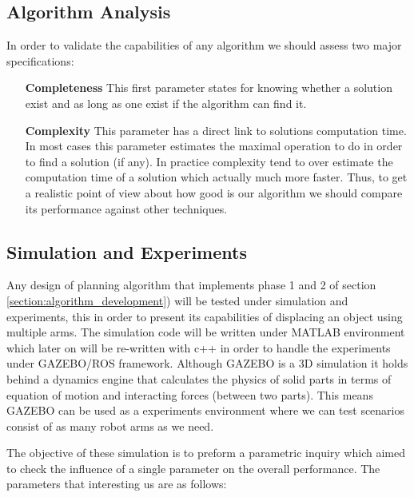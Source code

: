 \subsection{Algorithm Analysis}
In order to validate the capabilities of any algorithm we should assess two major specifications:

\begin{enumerate}

\item[\textbf{Completeness}] This first parameter states for knowing whether a solution exist and as long as one exist if the algorithm can find it.

\item[\textbf{Complexity}] This parameter has a direct link to solutions computation time. In most cases this parameter estimates the maximal operation to do in order to find a solution (if any). In practice complexity tend to over estimate the computation time of a solution which actually much more faster. Thus, to get a realistic point of view about how good is our algorithm we should compare its performance against other techniques.


\end{enumerate}




\subsection{Simulation and Experiments}
\label{section:sim_and_exp}

Any design of planning algorithm that implements phase 1 and 2 of section \ref{section:algorithm_development}) will be tested under simulation and experiments, this in order to present its capabilities of displacing an object using multiple arms. The simulation code will be written under MATLAB environment which later on will be re-written with c++ in order to handle the experiments under GAZEBO/ROS framework. Although GAZEBO is a 3D simulation it holds behind a dynamics engine that calculates the physics of solid parts in terms of equation of motion and interacting forces (between two parts). This means GAZEBO can be used as a experiments environment where we can test scenarios consist of as many robot arms as we need. 

The objective of these simulation is to preform a parametric inquiry which aimed to check the influence of a single parameter on the overall performance. The parameters that interesting us are as follows:

